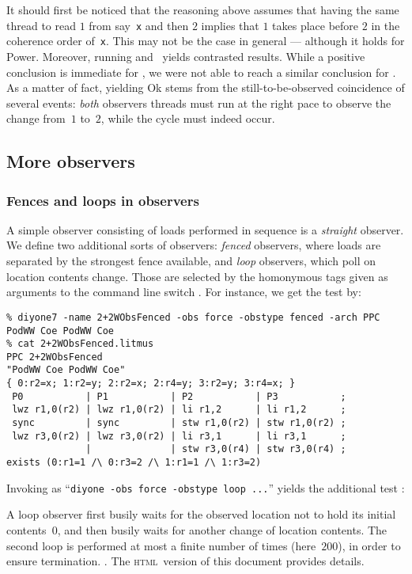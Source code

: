 It should first be noticed that the reasoning above assumes
that having the same thread to read $1$ from say~\texttt{x}
and then $2$ implies that $1$ takes place before $2$
in the coherence order of~\texttt{x}.
This may not be the case in general --- although it holds for Power.
Moreover, running  and~
yields contrasted results. While a positive conclusion is
immediate for , we were not able to reach a similar conclusion
for .
As a matter of fact,  yielding Ok stems from the
still-to-be-observed coincidence
of several events: \emph{both} observers threads must run at the right pace to
observe the change from~$1$ to~$2$, while the cycle must indeed occur.

\subsection{More\label{sec:obstype} observers}

\subsubsection{Fences and loops in observers}
A simple observer consisting of loads performed in sequence is a
\emph{straight} observer. We define two additional sorts of observers:
\emph{fenced} observers, where loads are separated by the strongest fence
available, and \emph{loop} observers, which poll on location contents change.
Those are selected by the homonymous tags given as arguments to the command
line switch . For instance, we get the test
 by:
\begin{verbatim}
% diyone7 -name 2+2WObsFenced -obs force -obstype fenced -arch PPC PodWW Coe PodWW Coe
% cat 2+2WObsFenced.litmus
PPC 2+2WObsFenced
"PodWW Coe PodWW Coe"
{ 0:r2=x; 1:r2=y; 2:r2=x; 2:r4=y; 3:r2=y; 3:r4=x; }
 P0           | P1           | P2           | P3           ;
 lwz r1,0(r2) | lwz r1,0(r2) | li r1,2      | li r1,2      ;
 sync         | sync         | stw r1,0(r2) | stw r1,0(r2) ;
 lwz r3,0(r2) | lwz r3,0(r2) | li r3,1      | li r3,1      ;
              |              | stw r3,0(r4) | stw r3,0(r4) ;
exists (0:r1=1 /\ 0:r3=2 /\ 1:r1=1 /\ 1:r3=2)
\end{verbatim}
Invoking \diyone{} as ``\verb+diyone -obs force -obstype loop ...+''
yields the additional  test \ifhevea:

A loop observer first busily waits for the observed location not
to hold its initial contents~$0$, and then busily waits for another change
of location contents.
The second loop is performed at most a finite number of times
(here~$200$), in order to ensure termination.
\else.
The \textsc{html}~version of this document provides details.
\fi

